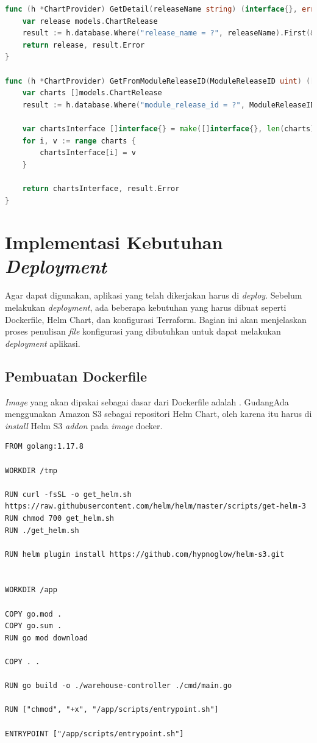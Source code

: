 \begin{lstlisting}[frame=single,language=Go,caption={Fungsi pemanggilan ke \textit{database}},label={code:databaseFunc}]
func (h *ChartProvider) GetDetail(releaseName string) (interface{}, error) {
	var release models.ChartRelease
	result := h.database.Where("release_name = ?", releaseName).First(&release)
	return release, result.Error
}

func (h *ChartProvider) GetFromModuleReleaseID(ModuleReleaseID uint) ([]interface{}, error) {
	var charts []models.ChartRelease
	result := h.database.Where("module_release_id = ?", ModuleReleaseID).Find(&charts)

	var chartsInterface []interface{} = make([]interface{}, len(charts))
	for i, v := range charts {
		chartsInterface[i] = v
	}

	return chartsInterface, result.Error
}
\end{lstlisting}

\section{Implementasi Kebutuhan \textit{Deployment}}
\label{sec:implementasiKebutuhanDeployment}

Agar dapat digunakan, aplikasi yang telah dikerjakan harus di \textit{deploy}. Sebelum melakukan \textit{deployment}, ada beberapa kebutuhan yang harus dibuat seperti Dockerfile, Helm Chart, dan konfigurasi Terraform. Bagian ini akan menjelaskan proses penulisan \textit{file} konfigurasi yang dibutuhkan untuk dapat melakukan \textit{deployment} aplikasi.

\subsection{Pembuatan Dockerfile}
\label{sec:dockerfile}

\textit{Image} yang akan dipakai sebagai dasar dari Dockerfile adalah . GudangAda menggunakan Amazon S3 sebagai repositori Helm Chart, oleh karena itu harus di \textit{install} Helm S3 \textit{addon} pada \textit{image} docker.

\begin{lstlisting}[frame=single,caption={Dockerfile},label={code:dockerfile}]
FROM golang:1.17.8

WORKDIR /tmp

RUN curl -fsSL -o get_helm.sh https://raw.githubusercontent.com/helm/helm/master/scripts/get-helm-3
RUN chmod 700 get_helm.sh
RUN ./get_helm.sh

RUN helm plugin install https://github.com/hypnoglow/helm-s3.git


WORKDIR /app

COPY go.mod .
COPY go.sum .
RUN go mod download

COPY . .

RUN go build -o ./warehouse-controller ./cmd/main.go

RUN ["chmod", "+x", "/app/scripts/entrypoint.sh"]

ENTRYPOINT ["/app/scripts/entrypoint.sh"]
\end{lstlisting}

